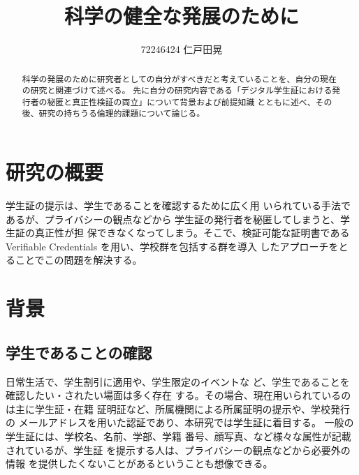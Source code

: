 \documentclass[10pt]{ltjsarticle}
\begin{document}

\title{科学の健全な発展のために}

\author{
    72246424 仁戸田晃
}

\begin{abstract}
科学の発展のために研究者としての自分がすべきだと考えていることを、自分の現在の研究と関連づけて述べる。
先に自分の研究内容である「デジタル学生証における発行者の秘匿と真正性検証の両立」について背景および前提知識
とともに述べ、その後、研究の持ちうる倫理的課題について論じる。
\end{abstract}

\maketitle
\thispagestyle{empty}

\section{研究の概要}
学生証の提示は、学生であることを確認するために広く用
いられている手法であるが、プライバシーの観点などから
学生証の発行者を秘匿してしまうと、学生証の真正性が担
保できなくなってしまう。そこで、検証可能な証明書である
Verifiable Credentials を用い、学校群を包括する群を導入
したアプローチをとることでこの問題を解決する。

\section{背景}

\subsection{学生であることの確認}
日常生活で、学生割引に適用や、学生限定のイベントな
ど、学生であることを確認したい・されたい場面は多く存在
する。その場合、現在用いられているのは主に学生証・在籍
証明証など、所属機関による所属証明の提示や、学校発行の
メールアドレスを用いた認証であり、本研究では学生証に着目する。
一般の学生証には、学校名、名前、学部、学籍
番号、顔写真、など様々な属性が記載されているが、学生証
を提示する人は、プライバシーの観点などから必要外の情報
を提供したくないことがあるということも想像できる。
\end{document}
